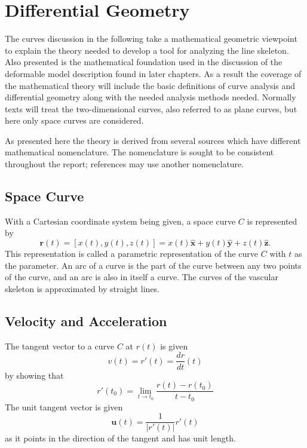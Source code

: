 
\chapter{Differential Geometry}
\label{app:differential-geometry}


The curves discussion in the following take a mathematical geometric
viewpoint to explain the theory needed to develop a tool for analyzing
the line skeleton. Also presented is the mathematical foundation used
in the discussion of the deformable model description found in later
chapters. As a result the coverage of the mathematical theory will
include the basic definitions of curve analysis and differential
geometry along with the needed analysis methods needed. Normally texts
will treat the two-dimensional curves, also referred to as plane
curves, but here only space curves are considered.

As presented here the theory is derived from several sources which
have different mathematical nomenclature. The nomenclature is sought
to be consistent throughout the report; references may use another
nomenclature.

\section{Space Curve}
\label{sec:space-curve}

With a Cartesian coordinate system being given, a space curve $C$ is
represented by
\begin{equation}
  \label{eq:space-curve}
  \bm{r}(t) = [x(t),y(t),z(t)] =   x(t)\hat{\mathbf{x}} + y(t)\hat{\mathbf{y}} + z(t)\hat{\mathbf{z}}.
\end{equation}
This representation is called a parametric representation of the curve
$C$ with $t$ as the parameter. An arc of a curve is the part of the
curve between any two points of the curve, and an arc is also in
itself a curve. The curves of the vascular skeleton is approximated by
straight lines.

\section{Velocity and Acceleration}
\label{sec:velocity-acceleration}

The tangent vector to a curve $C$ at $r(t)$ is given
\begin{equation}
  \label{tangent-vector}
  v(t) = r'(t) = \frac{dr}{dt}(t)
\end{equation}
by showing that
\begin{equation}
  \nonumber
  r'(t_0) = \lim_{t\rightarrow t_0} \frac{r(t) - r(t_0)}{t - t_0}
\end{equation}
The unit tangent vector is given
\begin{equation}
  \label{eq:unit-tangent-vector}
  \mathbf{u}(t) = \frac{1}{\lvert r'(t)\rvert}r'(t)
\end{equation}
as it points in the direction of the tangent and has unit length.

